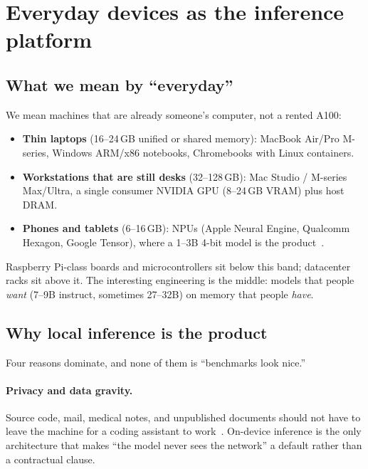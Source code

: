 \section{Everyday devices as the inference platform}
\label{sec:devices}

\subsection{What we mean by ``everyday''}

We mean machines that are already someone's computer, not a rented A100:

\begin{itemize}[leftmargin=*,itemsep=2pt]
  \item \textbf{Thin laptops} (16--24\,GB unified or shared memory): MacBook Air/Pro M-series, Windows ARM/x86 notebooks, Chromebooks with Linux containers.
  \item \textbf{Workstations that are still desks} (32--128\,GB): Mac Studio / M-series Max/Ultra, a single consumer NVIDIA GPU (8--24\,GB VRAM) plus host DRAM.
  \item \textbf{Phones and tablets} (6--16\,GB): NPUs (Apple Neural Engine, Qualcomm Hexagon, Google Tensor), where a 1--3B 4-bit model is the product~\citep{abdin2024phi3,gunter2024apple,liu2024mobilellm}.
\end{itemize}

Raspberry Pi-class boards and microcontrollers sit below this band; datacenter racks sit above it. The interesting engineering is the middle: models that people \emph{want} (7--9B instruct, sometimes 27--32B) on memory that people \emph{have}.

\subsection{Why local inference is the product}

Four reasons dominate, and none of them is ``benchmarks look nice.''

\paragraph{Privacy and data gravity.}
Source code, mail, medical notes, and unpublished documents should not have to leave the machine for a coding assistant to work~\citep{bommasani2021foundation,chen2024personal}. On-device inference is the only architecture that makes ``the model never sees the network'' a default rather than a contractual clause.

